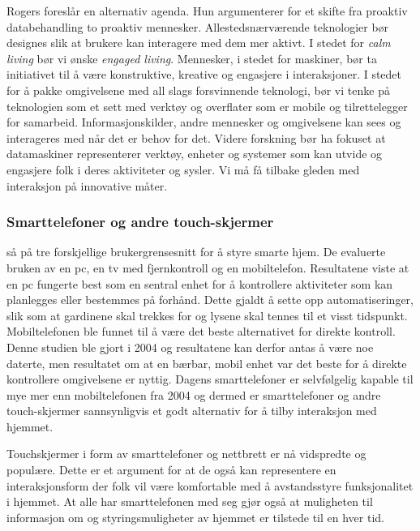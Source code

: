 Rogers foreslår en alternativ agenda. Hun argumenterer for et skifte fra proaktiv databehandling to proaktiv mennesker. Allestedsnærværende teknologier bør designes slik at brukere kan interagere med dem mer aktivt. I stedet for \emph{calm living} bør vi ønske \emph{engaged living}. Mennesker, i stedet for maskiner, bør ta initiativet til å være konstruktive, kreative og engasjere i interaksjoner. I stedet for å pakke omgivelsene med all slags forsvinnende teknologi, bør vi tenke på teknologien som et sett med verktøy og overflater som er mobile og tilrettelegger for samarbeid. Informasjonskilder, andre mennesker og omgivelsene kan sees og interageres med når det er behov for det. Videre forskning bør ha fokuset at datamaskiner representerer verktøy, enheter og systemer som kan utvide og engasjere folk i deres aktiviteter og sysler. Vi må få tilbake gleden med interaksjon på innovative måter.

\subsubsection*{Smarttelefoner og andre touch-skjermer}
\citet{koskela04} så på tre forskjellige brukergrensesnitt for å styre smarte hjem. De evaluerte bruken av en pc, en tv med fjernkontroll og en mobiltelefon. Resultatene viste at en pc fungerte best som en sentral enhet for å kontrollere aktiviteter som kan planlegges eller bestemmes på forhånd. Dette gjaldt å sette opp automatiseringer, slik som at gardinene skal trekkes for og lysene skal tennes til et visst tidspunkt. Mobiltelefonen ble funnet til å være det beste alternativet for direkte kontroll. Denne studien ble gjort i 2004 og resultatene kan derfor antas å være noe daterte, men resultatet om at en bærbar, mobil enhet var det beste for å direkte kontrollere omgivelsene er nyttig. Dagens smarttelefoner er selvfølgelig kapable til mye mer enn mobiltelefonen fra 2004 og dermed er smarttelefoner og andre touch-skjermer sannsynligvis et godt alternativ for å tilby interaksjon med hjemmet.

Touchskjermer i form av smarttelefoner og nettbrett er nå vidspredte og populære. Dette er et argument for at de også kan representere en interaksjonsform der folk vil være komfortable med å avstandsstyre funksjonalitet i hjemmet. At alle har smarttelefonen med seg gjør også at muligheten til informasjon om og styringsmuligheter av hjemmet er tilstede til en hver tid.

